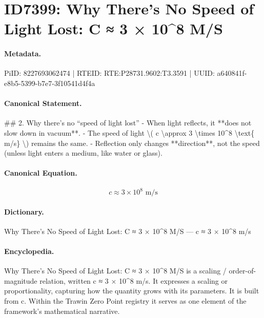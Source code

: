 \section*{ID7399: Why There’s No Speed of Light Lost: C ≈ 3 × 10\textasciicircum{}8 M/S}
\paragraph{Metadata.}
PiID: 8227693062474 | RTEID: RTE:P28731.9602:T3.3591 | UUID: a640841f-e8b5-5399-b7e7-3f10541d4f4a

\paragraph{Canonical Statement.}
\#\# 2. Why there’s no “speed of light lost” - When light reflects, it **does not slow down in vacuum**. - The speed of light \textbackslash{}( c \textbackslash{}approx 3 \textbackslash{}times 10\textasciicircum{}8 \textbackslash{}text\{ m/s\} \textbackslash{}) remains the same. - Reflection only changes **direction**, not the speed (unless light enters a medium, like water or glass).

\paragraph{Canonical Equation.}
\[
c \approx 3 \times 10^8 \text{ m/s}
\]

\paragraph{Dictionary.}
Why There’s No Speed of Light Lost: C ≈ 3 × 10\textasciicircum{}8 M/S — c ≈ 3 × 10\textasciicircum{}8 m/s

\paragraph{Encyclopedia.}
Why There’s No Speed of Light Lost: C ≈ 3 × 10\textasciicircum{}8 M/S is a scaling / order-of-magnitude relation, written c ≈ 3 × 10\textasciicircum{}8 m/s. It expresses a scaling or proportionality, capturing how the quantity grows with its parameters. It is built from c. Within the Trawin Zero Point registry it serves as one element of the framework's mathematical narrative.
